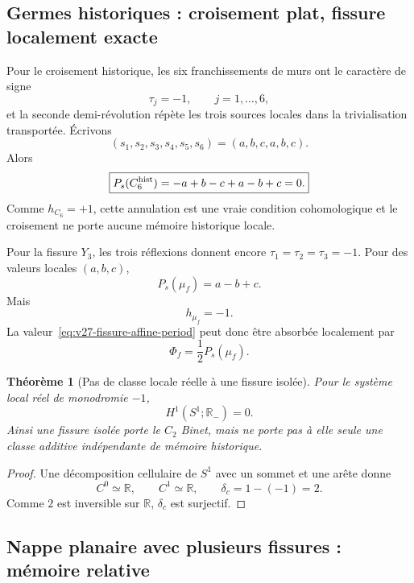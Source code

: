\documentclass[11pt,a4paper]{article}
\newtheorem{theorem}{Théorème}[section]
\begin{document}
\subsection{Germes historiques : croisement plat, fissure localement exacte}

Pour le croisement historique, les six franchissements de murs ont le caractère de signe
\[
 \tau_j=-1,
 \qquad j=1,\ldots,6,
\]
et la seconde demi-révolution répète les trois sources locales dans la trivialisation transportée. Écrivons
\[
 (s_1,s_2,s_3,s_4,s_5,s_6)
 =(a,b,c,a,b,c).
\]
Alors
\begin{equation}\label{eq:v27-cross-period}
 \boxed{
 P_s(C_6^{\rm hist})
 =-a+b-c+a-b+c
 =0.}
\end{equation}
Comme $h_{C_6}=+1$, cette annulation est une vraie condition cohomologique et le croisement ne porte aucune mémoire historique locale.

Pour la fissure $Y_3$, les trois réflexions donnent encore $\tau_1=\tau_2=\tau_3=-1$. Pour des valeurs locales $(a,b,c)$,
\begin{equation}\label{eq:v27-fissure-affine-period}
 \boxed{
 P_s(\mu_f)
 =a-b+c.}
\end{equation}
Mais
\[
 h_{\mu_f}=-1.
\]
La valeur~\eqref{eq:v27-fissure-affine-period} peut donc être absorbée localement par
\[
 \Phi_f=\frac12P_s(\mu_f).
\]

\begin{theorem}[Pas de classe locale réelle à une fissure isolée]\label{thm:v27-local-fissure-H1}
Pour le système local réel de monodromie $-1$,
\begin{equation}\label{eq:v27-H1-circle-sign}
 \boxed{
 H^1(S^1;\mathbb R_{-})=0.}
\end{equation}
Ainsi une fissure isolée porte le $C_2$ Binet, mais ne porte pas à elle seule une classe additive indépendante de mémoire historique.
\end{theorem}

\begin{proof}
Une décomposition cellulaire de $S^1$ avec un sommet et une arête donne
\[
 C^0\simeq\mathbb R,
 \qquad
 C^1\simeq\mathbb R,
 \qquad
 \delta_c=1-(-1)=2.
\]
Comme $2$ est inversible sur $\mathbb R$, $\delta_c$ est surjectif.
\end{proof}

\subsection{Nappe planaire avec plusieurs fissures : mémoire relative}
\end{document}
